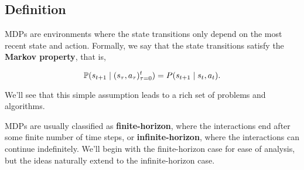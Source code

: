 \documentclass[../main/main]{subfiles}
\begin{document}
\subsection{Definition}

MDPs are environments where the state transitions only depend on the most recent state and action. Formally, we say that the state transitions satisfy the \textbf{Markov property}, that is,

\[
    \P(s_{t+1} \mid (s_\tau, a_\tau)_{\tau=0}^t) = P(s_{t+1} \mid s_t, a_t).
\]

We'll see that this simple assumption leads to a rich set of problems and algorithms.

MDPs are usually classified as \textbf{finite-horizon}, where the interactions end after some finite number of time steps, or \textbf{infinite-horizon}, where the interactions can continue indefinitely. We'll begin with the finite-horizon case for ease of analysis, but the ideas naturally extend to the infinite-horizon case.

\end{document}
